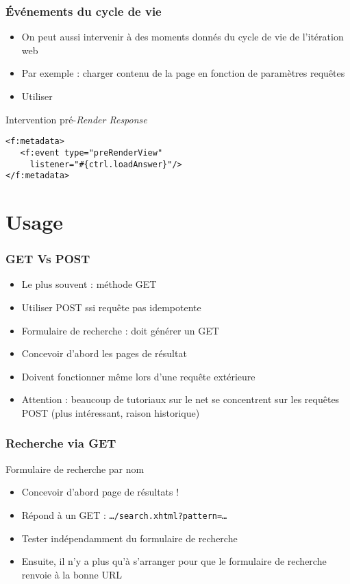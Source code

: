 \documentclass[english, french]{beamer}
\begin{document}
\begin{frame}[fragile]
	\frametitle{Événements du cycle de vie}
	\begin{itemize}
		\item On peut aussi intervenir à des moments donnés du cycle de vie de l’itération web
		\item Par exemple : charger contenu de la page en fonction de paramètres requêtes
		\item Utiliser 
	\end{itemize}
	\begin{exampleblock}{Intervention pré-\emph{Render Response}}
		\begin{lstlisting}
<f:metadata>
   <f:event type="preRenderView"
     listener="#{ctrl.loadAnswer}"/>
</f:metadata>
		\end{lstlisting}
	\end{exampleblock}
\end{frame}

\section{Usage}
\begin{frame}
	\frametitle{GET Vs POST}
	\begin{itemize}
		\item Le plus souvent : méthode GET
		\item Utiliser POST \alert{ssi requête pas idempotente}
		\item Formulaire de recherche : doit générer un GET
		\item Concevoir d’abord les pages de résultat
		\item Doivent fonctionner même lors d’une requête extérieure
		\item Attention : beaucoup de tutoriaux sur le net se concentrent sur les requêtes POST {\tiny (plus intéressant, raison historique)}
	\end{itemize}
\end{frame}

\begin{frame}
	\frametitle{Recherche via GET}
	\begin{exampleblock}{Formulaire de recherche par nom}
		\begin{itemize}
			\item Concevoir d’abord page de résultats !
			\item Répond à un GET : \texttt{…/search.xhtml?pattern=…}
			\item Tester indépendamment du formulaire de recherche
			\item Ensuite, il n’y a plus qu’à s’arranger pour que le formulaire de recherche renvoie à la bonne URL
		\end{itemize}
	\end{exampleblock}
\end{frame}
\end{document}
